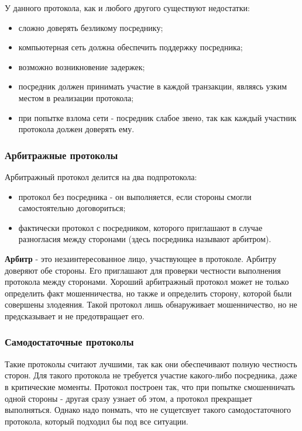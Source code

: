 \documentclass[a4paper]{article}
\begin{document}
У данного протокола, как и любого другого существуют недостатки:
\begin{itemize}
    \item сложно доверять безликому посреднику;
    \item компьютерная сеть должна обеспечить поддержку посредника;
    \item возможно возникновение задержек;
    \item посредник должен принимать участие в каждой транзакции, являясь узким местом в реализации протокола;
    \item при попытке взлома сети - посредник слабое звено, так как каждый участник протокола должен доверять ему.
\end{itemize}
\subsubsection{Арбитражные протоколы}
Арбитражный протокол делится на два подпротокола:
\begin{itemize}
    \item протокол без посредника - он выполняется, если стороны смогли самостоятельно договориться;
    \item фактически протокол с посредником, которого приглашают в случае разногласия между сторонами (здесь посредника называют арбитром).
\end{itemize} 
\par 
\textbf{Арбитр} - это незаинтересованное лицо, участвующее в протоколе. Арбитру доверяют обе стороны. Его приглашают для проверки честности выполнения протокола между сторонами.
Хороший арбитражный протокол может не только определить факт мошенничества, но также и определить сторону, которой были совершены злодеяния. Такой протокол лишь обнаруживает мошенничество, но не предсказывает и не предотвращает его.
\subsubsection{Самодостаточные протоколы}
Такие протоколы считают лучшими, так как они обеспечивают полную честность сторон. Для такого протокола не требуется участие какого-либо посредника, даже в критические моменты. Протокол построен так, что при попытке смошенничать одной стороны - другая сразу узнает об этом, а протокол прекращает выполняться.
Однако надо понмать, что не сущетсвует такого самодостаточного протокола, который подходил бы под все ситуации. 
\end{document}
